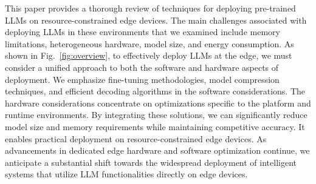 \documentclass[11pt]{IEEEtran}
\begin{document}
This paper provides a thorough review of techniques for deploying pre-trained LLMs on resource-constrained edge devices. The main challenges associated with deploying LLMs in these environments that we examined include memory limitations, heterogeneous hardware, model size, and energy consumption. As shown in Fig.~\ref{fig:overview}, to effectively deploy LLMs at the edge, we must consider a unified approach to both the software and hardware aspects of deployment. We emphasize fine-tuning methodologies, model compression techniques, and efficient decoding algorithms in the software considerations. The hardware considerations concentrate on optimizations specific to the platform and runtime environments. By integrating these solutions, we can significantly reduce model size and memory requirements while maintaining competitive accuracy. It enables practical deployment on resource-constrained edge devices. As advancements in dedicated edge hardware and software optimization continue, we anticipate a substantial shift towards the widespread deployment of intelligent systems that utilize LLM functionalities directly on edge devices.
\end{document}
